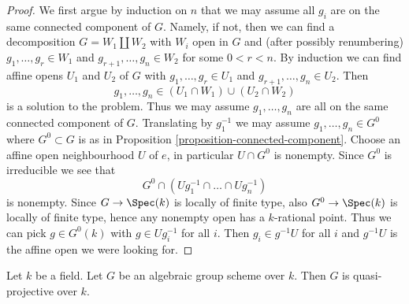 \begin{proof}
We first argue by induction on $n$ that we may assume all $g_i$ are
on the same connected component of $G$. Namely, if not, then we can
find a decomposition $G = W_1 \amalg W_2$ with $W_i$ open in $G$ and
(after possibly renumbering) $g_1, \ldots, g_r \in W_1$ and
$g_{r + 1}, \ldots, g_n \in W_2$ for some $0 < r < n$. By
induction we can find affine opens $U_1$ and $U_2$ of $G$ with
$g_1, \ldots, g_r \in U_1$ and $g_{r + 1}, \ldots, g_n \in U_2$.
Then
$$
g_1, \ldots, g_n \in (U_1 \cap W_1) \cup (U_2 \cap W_2)
$$
is a solution to the problem. Thus we may assume $g_1, \ldots, g_n$
are all on the same connected component of $G$. Translating by $g_1^{-1}$
we may assume $g_1, \ldots, g_n \in G^0$ where $G^0 \subset G$ is as in
Proposition \ref{proposition-connected-component}. Choose an affine
open neighbourhood $U$ of $e$, in particular $U \cap G^0$ is nonempty.
Since $G^0$ is irreducible we see that
$$
G^0 \cap (Ug_1^{-1} \cap \ldots \cap Ug_n^{-1})
$$
is nonempty. Since $G \to \Spec(k)$ is locally of finite type, also
$G^0 \to \Spec(k)$ is locally of finite type, hence any nonempty
open has a $k$-rational point. Thus we can pick $g \in G^0(k)$ with
$g \in Ug_i^{-1}$ for all $i$. Then $g_i \in g^{-1}U$ for all $i$
and $g^{-1}U$ is the affine open we were looking for.
\end{proof}

\begin{lemma}
\label{lemma-algebraic-quasi-projective}
Let $k$ be a field. Let $G$ be an algebraic group scheme over $k$.
Then $G$ is quasi-projective over $k$.
\end{lemma}

